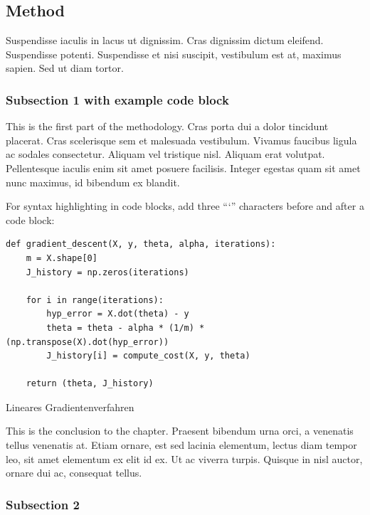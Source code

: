 \hypertarget{method}{%
\subsection{Method}\label{method}}

Suspendisse iaculis in lacus ut dignissim. Cras dignissim dictum
eleifend. Suspendisse potenti. Suspendisse et nisi suscipit,
vestibulum est at, maximus sapien. Sed ut diam tortor.

\hypertarget{subsection-1-with-example-code-block}{%
\subsubsection{Subsection 1 with example code
block}\label{subsection-1-with-example-code-block}}

This is the first part of the methodology. Cras porta dui a dolor
tincidunt placerat. Cras scelerisque sem et malesuada vestibulum.
Vivamus faucibus ligula ac sodales consectetur. Aliquam vel
tristique nisl. Aliquam erat volutpat. Pellentesque iaculis enim sit
amet posuere facilisis. Integer egestas quam sit amet nunc maximus,
id bibendum ex blandit.

For syntax highlighting in code blocks, add three \enquote{`}
characters before and after a code block:

\begin{listing}[htbp]
\begin{verbatim}
def gradient_descent(X, y, theta, alpha, iterations):
    m = X.shape[0]
    J_history = np.zeros(iterations)

    for i in range(iterations):
        hyp_error = X.dot(theta) - y
        theta = theta - alpha * (1/m) * (np.transpose(X).dot(hyp_error))
        J_history[i] = compute_cost(X, y, theta)

    return (theta, J_history)
\end{verbatim}
\caption{Lineares Gradientenverfahren
\autocite[vgl.][33-35]{Press_NumericalRecipes_2007}}
\label{linear-gradient-descent}
\end{listing}

This is the conclusion to the chapter. Praesent bibendum urna orci,
a venenatis tellus venenatis at. Etiam ornare, est sed lacinia
elementum, lectus diam tempor leo, sit amet elementum ex elit id ex.
Ut ac viverra turpis. Quisque in nisl auctor, ornare dui ac,
consequat tellus.

\hypertarget{subsection-2}{%
\subsubsection{Subsection 2}\label{subsection-2}}

